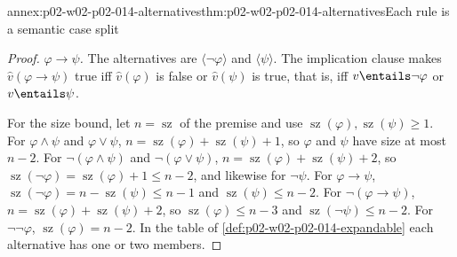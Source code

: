 \begin{annexitem}{annex:p02-w02-p02-014-alternatives}{thm:p02-w02-p02-014-alternatives}{Each rule is a semantic case split}
\begin{proof}
\emph{\(\varphi\to\psi\).}  The alternatives are \(\langle\neg\varphi\rangle\)
and \(\langle\psi\rangle\).  The implication clause makes
\(\widehat v(\varphi\to\psi)\) true iff \(\widehat v(\varphi)\) is false or
\(\widehat v(\psi)\) is true, that is, iff \(v\entails\neg\varphi\) or
\(v\entails\psi\).

For the size bound, let \(n=\operatorname{sz}\) of the premise and use
\(\operatorname{sz}(\varphi),\operatorname{sz}(\psi)\geq1\).  For
\(\varphi\land\psi\) and \(\varphi\lor\psi\), \(n=\operatorname{sz}(\varphi)+
\operatorname{sz}(\psi)+1\), so \(\varphi\) and \(\psi\) have size at most
\(n-2\).  For \(\neg(\varphi\land\psi)\) and \(\neg(\varphi\lor\psi)\),
\(n=\operatorname{sz}(\varphi)+\operatorname{sz}(\psi)+2\), so
\(\operatorname{sz}(\neg\varphi)=\operatorname{sz}(\varphi)+1\leq n-2\), and
likewise for \(\neg\psi\).  For \(\varphi\to\psi\),
\(\operatorname{sz}(\neg\varphi)=n-\operatorname{sz}(\psi)\leq n-1\) and
\(\operatorname{sz}(\psi)\leq n-2\).  For \(\neg(\varphi\to\psi)\),
\(n=\operatorname{sz}(\varphi)+\operatorname{sz}(\psi)+2\), so
\(\operatorname{sz}(\varphi)\leq n-3\) and
\(\operatorname{sz}(\neg\psi)\leq n-2\).  For \(\neg\neg\varphi\),
\(\operatorname{sz}(\varphi)=n-2\).  In the table of
\cref{def:p02-w02-p02-014-expandable} each alternative has one or two
members.
\end{proof}
\end{annexitem}

